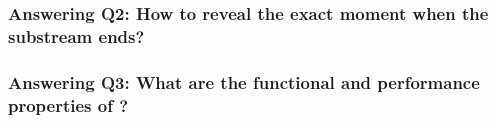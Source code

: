 \subsubsection{Answering Q2: How to reveal the exact moment when the substream ends?}

\subsubsection{Answering Q3: What are the functional and performance properties of \tracker?}
